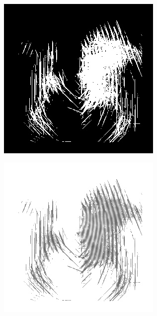 \documentclass{beamer}
\begin{document}
{\begin{figure}[!ht]
\begin{subfigure}[ht]{0.15\textwidth}
        \end{subfigure}
        \qquad
        \begin{subfigure}[ht]{0.15\textwidth}
            \includegraphics[width=\textwidth]{fingerprints/2000Db1a/2_4_mask.jpg}
        \end{subfigure}
        \qquad
        \begin{subfigure}[ht]{0.15\textwidth}
            \includegraphics[width=\textwidth]{fingerprints/2000Db1a/2_4_filtered.jpg}

\end{subfigure}
\end{figure}}
\end{document}
